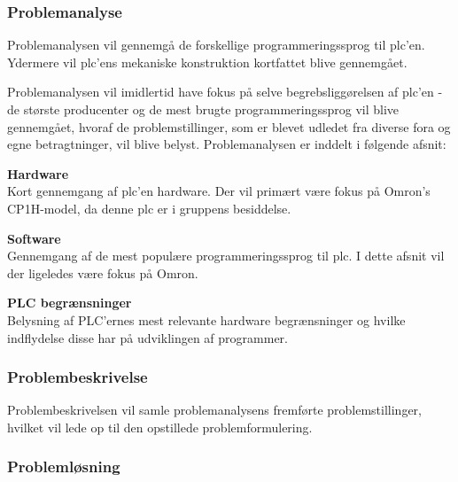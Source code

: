 \label{sec:rapportstruktur}


\subsubsection*{Problemanalyse}
Problemanalysen vil gennemgå de forskellige programmeringssprog til \gls{plc}'en. Ydermere vil \gls{plc}'ens mekaniske konstruktion kortfattet blive gennemgået. 

Problemanalysen vil imidlertid have fokus på selve begrebsliggørelsen af \gls{plc}'en - de største producenter og de mest brugte programmeringssprog vil blive gennemgået, hvoraf de problemstillinger, som er blevet udledet fra diverse fora og egne betragtninger, vil blive belyst. Problemanalysen er inddelt i følgende afsnit:

\begin{itemize_small}
    \item \textbf{Hardware} \\
    Kort gennemgang af \gls{plc}'en hardware. Der vil primært være fokus på Omron's CP1H-model, da denne \gls{plc} er i gruppens besiddelse.
    \item \textbf{Software} \\
    Gennemgang af de mest populære programmeringssprog til \gls{plc}. I dette afsnit vil der ligeledes være fokus på Omron.
    \item \textbf{PLC begrænsninger} \\
    Belysning af PLC'ernes mest relevante hardware begrænsninger og hvilke indflydelse disse har på udviklingen af programmer.
\end{itemize_small}

\subsubsection*{Problembeskrivelse}
Problembeskrivelsen vil samle problemanalysens fremførte problemstillinger, hvilket vil lede op til den opstillede problemformulering.

\subsubsection*{Problemløsning}

